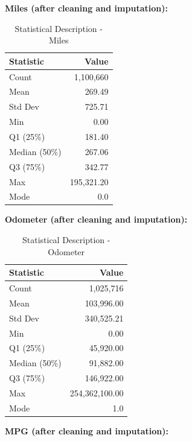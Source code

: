 \documentclass{article}
\begin{document}
\textbf{Miles (after cleaning and imputation):}

\begin{table}[H]
    \centering
    \caption{Statistical Description - Miles}
    \begin{tabular}{l r}
        \toprule
        \textbf{Statistic} & \textbf{Value} \\
        \midrule
        Count & 1,100,660 \\
        Mean & 269.49 \\
        Std Dev & 725.71 \\
        Min & 0.00 \\
        Q1 (25\%) & 181.40 \\
        Median (50\%) & 267.06 \\
        Q3 (75\%) & 342.77 \\
        Max & 195,321.20 \\
        Mode & 0.0 \\
        \bottomrule
    \end{tabular}
    \label{tab:stats_miles}
\end{table}

\textbf{Odometer (after cleaning and imputation):}

\begin{table}[H]
    \centering
    \caption{Statistical Description - Odometer}
    \begin{tabular}{l r}
        \toprule
        \textbf{Statistic} & \textbf{Value} \\
        \midrule
        Count & 1,025,716 \\
        Mean & 103,996.00 \\
        Std Dev & 340,525.21 \\
        Min & 0.00 \\
        Q1 (25\%) & 45,920.00 \\
        Median (50\%) & 91,882.00 \\
        Q3 (75\%) & 146,922.00 \\
        Max & 254,362,100.00 \\
        Mode & 1.0 \\
        \bottomrule
    \end{tabular}
    \label{tab:stats_odometer}
\end{table}

\textbf{MPG (after cleaning and imputation):}
\end{document}
